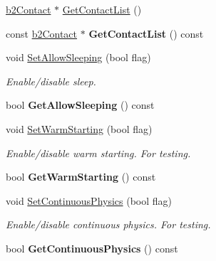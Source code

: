 \begin{DoxyCompactItemize}
\item 
\hyperlink{classb2_contact}{b2\+Contact} $\ast$ \hyperlink{classb2_world_ab1e1c59fd7534c0268c2a3e31370a425}{Get\+Contact\+List} ()
\item 
\mbox{\label{classb2_world_a8a947dbda196b037b922d62e6a54062f}} 
const \hyperlink{classb2_contact}{b2\+Contact} $\ast$ {\bfseries Get\+Contact\+List} () const
\item 
\mbox{\label{classb2_world_a6755872564fc3db70c69d2b9d349fa33}} 
void \hyperlink{classb2_world_a6755872564fc3db70c69d2b9d349fa33}{Set\+Allow\+Sleeping} (bool flag)
\begin{DoxyCompactList}\small\item\em Enable/disable sleep. \end{DoxyCompactList}\item 
\mbox{\label{classb2_world_a3d7ce9b87a54fb4f84433f6223d81175}} 
bool {\bfseries Get\+Allow\+Sleeping} () const
\item 
\mbox{\label{classb2_world_a8e8c12142e8c4884a18787926a261359}} 
void \hyperlink{classb2_world_a8e8c12142e8c4884a18787926a261359}{Set\+Warm\+Starting} (bool flag)
\begin{DoxyCompactList}\small\item\em Enable/disable warm starting. For testing. \end{DoxyCompactList}\item 
\mbox{\label{classb2_world_af23e93dbf44ebfc3c7ce9dfdc00b8ff7}} 
bool {\bfseries Get\+Warm\+Starting} () const
\item 
\mbox{\label{classb2_world_a536dd9181c2e20096073e3cfe2c8530a}} 
void \hyperlink{classb2_world_a536dd9181c2e20096073e3cfe2c8530a}{Set\+Continuous\+Physics} (bool flag)
\begin{DoxyCompactList}\small\item\em Enable/disable continuous physics. For testing. \end{DoxyCompactList}\item 
\mbox{\label{classb2_world_afec853cfec7a8bbffc20d4acc99963e7}} 
bool {\bfseries Get\+Continuous\+Physics} () const
\item 

\end{DoxyCompactItemize}
